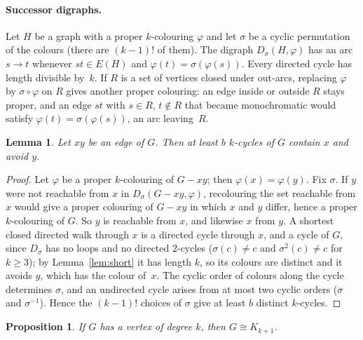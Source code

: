 \documentclass[11pt]{article}
\newtheorem{lemma}{Lemma}
\newtheorem{proposition}{Proposition}
\theoremstyle{remark}
\begin{document}
\paragraph{Successor digraphs.} Let $H$ be a graph with a proper
$k$-colouring $\varphi$ and let $\sigma$ be a cyclic permutation of the colours
(there are $(k-1)!$ of them). The digraph $D_\sigma(H,\varphi)$ has an arc
$s\to t$ whenever $st\in E(H)$ and $\varphi(t)=\sigma(\varphi(s))$. Every
directed cycle has length divisible by~$k$. If $R$ is a set of vertices closed
under out-arcs, replacing $\varphi$ by $\sigma\circ\varphi$ on $R$ gives
another proper colouring: an edge inside or outside $R$ stays proper, and an
edge $st$ with $s\in R$, $t\notin R$ that became monochromatic would satisfy
$\varphi(t)=\sigma(\varphi(s))$, an arc leaving~$R$.

\begin{lemma}\label{lem:edge}
Let $xy$ be an edge of $G$. Then at least $b$ $k$-cycles of $G$ contain $x$ and
avoid $y$.
\end{lemma}

\begin{proof}
Let $\varphi$ be a proper $k$-colouring of $G-xy$; then
$\varphi(x)=\varphi(y)$. Fix $\sigma$. If $y$ were not reachable from $x$ in
$D_\sigma(G-xy,\varphi)$, recolouring the set reachable from $x$ would give a
proper colouring of $G-xy$ in which $x$ and $y$ differ, hence a proper
$k$-colouring of $G$. So $y$ is reachable from $x$, and likewise $x$ from $y$.
A shortest closed directed walk through $x$ is a directed cycle through $x$,
and a cycle of $G$, since $D_\sigma$ has no loops and no directed $2$-cycles
($\sigma(c)\ne c$ and $\sigma^2(c)\ne c$ for $k\ge3$); by
Lemma~\ref{lem:short} it has length $k$, so its colours are distinct and it
avoids $y$, which has the colour of~$x$. The cyclic order of colours along the
cycle determines $\sigma$, and an undirected cycle arises from at most two
cyclic orders ($\sigma$ and $\sigma^{-1}$). Hence the $(k-1)!$ choices of
$\sigma$ give at least $b$ distinct $k$-cycles.
\end{proof}

\begin{proposition}\label{prop:degk}
If $G$ has a vertex of degree $k$, then $G\cong K_{k+1}$.
\end{proposition}
\end{document}
